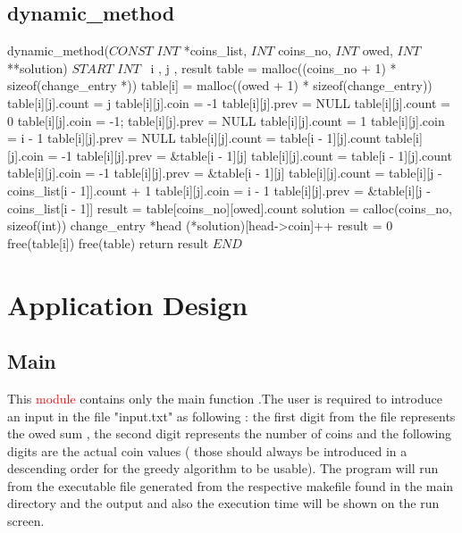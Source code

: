 \documentclass[12]{article}
\begin{document}
\newpage
\subsection{dynamic_method}
\begin{algorithmic}[1]
\STATE dynamic_method($CONST$ $INT$ *coins_list, $INT$ coins_no, $INT$ owed, $INT$ **solution)
\STATE $START$
\STATE $INT$ \ i , j , result
\STATE table = malloc((coins_no + 1) * sizeof(change_entry *))
\STATE table[i] = malloc((owed + 1) * sizeof(change_entry))
\ENDFOR
{}
\STATE table[i][j].count = j
\STATE table[i][j].coin = -1
\STATE table[i][j].prev = NULL
\STATE table[i][j].count = 0
\STATE table[i][j].coin = -1;
\STATE table[i][j].prev = NULL
\STATE table[i][j].count = 1
\STATE table[i][j].coin = i - 1
\STATE table[i][j].prev = NULL
\STATE table[i][j].count = table[i - 1][j].count
\STATE table[i][j].coin = -1
\STATE table[i][j].prev = \&table[i - 1][j]
\ELSE
{}
\STATE table[i][j].count = table[i - 1][j].count
\STATE table[i][j].coin = -1
\STATE table[i][j].prev = \&table[i - 1][j]
\ELSE
\STATE table[i][j].count = table[i][j - coins_list[i - 1]].count + 1
\STATE table[i][j].coin = i - 1
\STATE table[i][j].prev = \&table[i][j - coins_list[i - 1]]
\ENDIF
\ENDIF
\ENDFOR
\ENDFOR
\STATE result = table[coins_no][owed].count
\STATE *solution = calloc(coins_no, sizeof(int))
\newpage
{}
\STATE change_entry *head
\STATE (*solution)[head->coin]++
\ENDIF
\ENDFOR
\ELSE
\STATE result = 0 
\ENDIF
{}
\STATE free(table[i])
\ENDFOR
\STATE free(table)
\STATE return result
\STATE $END$
\end{algorithmic}

\newpage
\section{Application Design}
\subsection{Main}
\textbf{}

This \textcolor{red}{module} contains only the main function .The user is required to introduce an input in the file "input.txt" as following : the first digit from the file represents the owed sum , the second digit represents the number of coins and the following digits are the actual coin values ( those should always be introduced in a descending order for the greedy algorithm to be usable).
The program will run from the executable file generated from the respective makefile found in the main directory and the output and also the execution time will be shown on the run screen.
\end{document}
